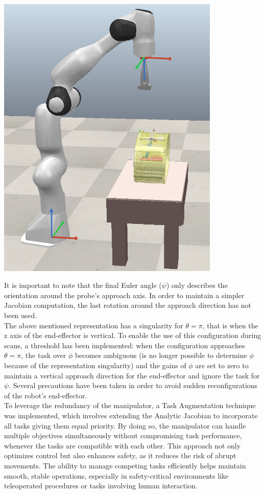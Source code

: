 \documentclass{article}
\begin{document}
\begin{minipage}{0.5\textwidth}
    \centering
    \includegraphics[width=0.8\textwidth]{Robot_with_RF.png}
    \label{Robot_standing}
\end{minipage}
\vspace{1cm}
\newline
It is important to note that the final Euler angle ($\psi$) only describes the orientation around the probe's approach axis. In order to maintain a simpler Jacobian computation, the last rotation around the approach direction has not been used.
\\
The above mentioned representation has a singularity for $\theta = \pi$, that is when the z axis of the end-effector is vertical. To enable the use of this configuration during scans, a threshold has been implemented: when the configuration approaches $\theta = \pi$, the task over $\phi$ becomes ambiguous (is no longer possible to determine $\phi$ because of the representation singularity) and the gains of $\phi$ are set to zero to maintain a vertical approach direction for the end-effector and ignore the task for $\psi$. Several precautions have been taken in order to avoid sudden reconfigurations of the robot’s end-effector.
\\
To leverage the redundancy of the manipulator, a Task Augmentation technique was implemented, which involves extending the Analytic Jacobian to incorporate all tasks giving them equal priority.
By doing so, the manipulator can handle multiple objectives simultaneously without compromising task performance, whenever the tasks are compatible with each other. This approach not only optimizes control but also enhances safety, as it reduces the risk of abrupt movements. The ability to manage competing tasks efficiently helps maintain smooth, stable operations, especially in safety-critical environments like teleoperated procedures or tasks involving human interaction.
\end{document}
